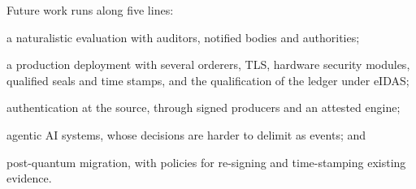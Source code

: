 Future work runs along five lines:
\begin{enumerate*}[label=(\roman*)]
\item a naturalistic evaluation with auditors, notified bodies and authorities;
\item a production deployment with several orderers, TLS, hardware security modules, qualified seals and time stamps, and the qualification of the ledger under eIDAS;
\item authentication at the source, through signed producers and an attested engine;
\item agentic AI systems, whose decisions are harder to delimit as events; and
\item post-quantum migration, with policies for re-signing and time-stamping existing evidence.
\end{enumerate*}
